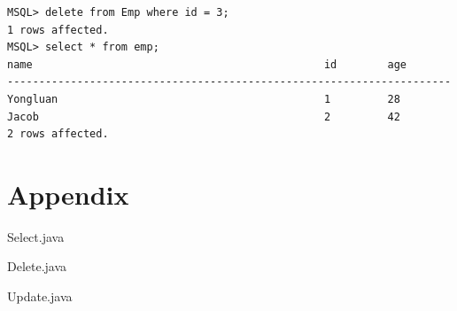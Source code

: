 \documentclass[a4paper,10pt,titlepage]{report}
\begin{document}
\begin{lstlisting}
MSQL> delete from Emp where id = 3;
1 rows affected.
MSQL> select * from emp;
name                                              id        age       
----------------------------------------------------------------------
Yongluan                                          1         28        
Jacob                                             2         42     
2 rows affected.  
\end{lstlisting}

\section{Appendix}
Select.java


Delete.java


Update.java

\end{document}
